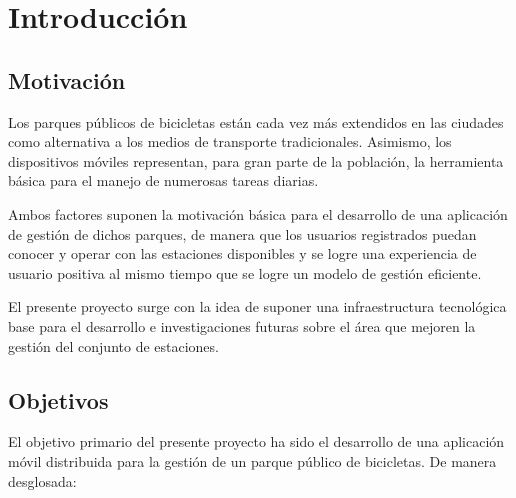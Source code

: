 \chapter{Introducción}

\section{Motivación}

Los parques públicos de bicicletas están cada vez más extendidos en las ciudades como alternativa a los medios de transporte tradicionales. Asimismo, los dispositivos móviles representan, para gran parte de la población, la herramienta básica para el manejo de numerosas tareas diarias.

Ambos factores suponen la motivación básica para el desarrollo de una aplicación de gestión de dichos parques, de manera que los usuarios registrados puedan conocer y operar con las estaciones disponibles y se logre una experiencia de usuario positiva al mismo tiempo que se logre un modelo de gestión eficiente.

El presente proyecto surge con la idea de suponer una infraestructura tecnológica base para el desarrollo e investigaciones futuras sobre el área que mejoren la gestión del conjunto de estaciones.


\section{Objetivos}
\label{sec:objetivos}

El objetivo primario del presente proyecto ha sido el desarrollo de una aplicación móvil distribuida para la gestión de un parque público de bicicletas. De manera desglosada:

